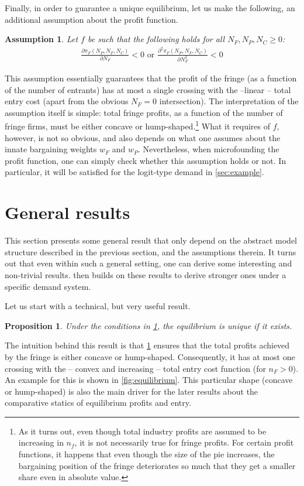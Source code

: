 \documentclass[a4paper]{article}
\newtheorem{proposition}{Proposition}
\newtheorem{assumption}{Assumption}
\begin{document}
Finally, in order to guarantee a unique equilibrium, let us make the following, an additional assumption about the profit function.
\begin{assumption}
    \label{ass:single_crossing}
    Let $f$ be such that the following holds for all $N_F, N_P, N_C \geq 0$:
    \begin{align*}
        \frac{\partial \pi_F(N_P, N_F, N_C)}{\partial N_F} < 0 \text{ or } \frac{\partial^2 \pi_F(N_P, N_F, N_C)}{\partial N_F^2} < 0
    \end{align*}
\end{assumption}
This assumption essentially guarantees that the profit of the fringe (as a function of the number of entrants) has at most a single crossing with the --linear -- total entry cost (apart from the obvious $N_F=0$ intersection).
The interpretation of the assumption itself is simple: total fringe profits, as a function of the number of fringe firms, must be either concave or hump-shaped.\footnote{
    As it turns out, even though total industry profits are assumed to be increasing in $n_f$, it is not necessarily true for fringe profits.
    For certain profit functions, it happens that even though the size of the pie increases, the bargaining position of the fringe deteriorates so much that they get a smaller share even in absolute value.
}
What it requires of $f$, however, is not so obvious, and also depends on what one assumes about the innate bargaining weights $w_F$ and $w_P$.
Nevertheless, when microfounding the profit function, one can simply check whether this assumption holds or not.
In particular, it will be satisfied for the logit-type demand in \cref{sec:example}.


\section{General results}
\label{sec:results}

This section presents some general result that only depend on the abstract model structure described in the previous section, and the assumptions therein.
It turns out that even within such a general setting, one can derive some interesting and non-trivial results.
 then builds on these results to derive stronger ones under a specific demand system.

Let us start with a technical, but very useful result.
\begin{proposition}
    \label{prop:unique_equilibrium}
    Under the conditions in \cref{ass:single_crossing}, the equilibrium is unique if it exists.
\end{proposition}
The intuition behind this result is that \cref{ass:single_crossing} ensures that the total profits achieved by the fringe is either concave or hump-shaped.
Consequently, it has at most one crossing with the -- convex and increasing -- total entry cost function (for $n_F > 0$).
An example for this is shown in \cref{fig:equilibrium}.
This particular shape (concave or hump-shaped) is also the main driver for the later results about the comparative statics of equilibrium profits and entry.
\end{document}
